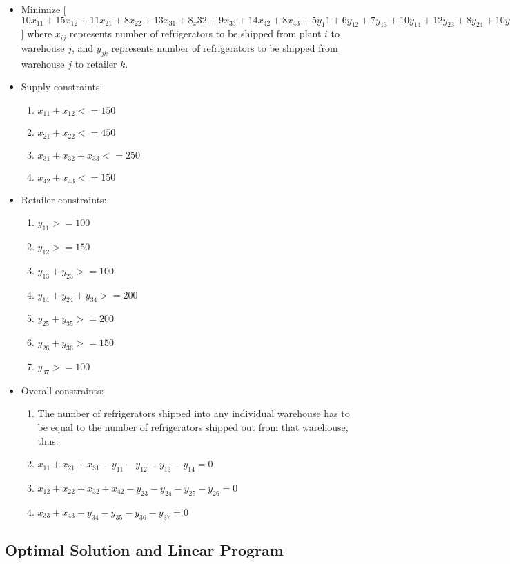 \documentclass[11pt]{scrreprt}
\begin{document}
\begin{itemize}
	\item Minimize
[$10x_{11}+15x_{12}+11x_{21}+8x_{22}+13x_{31}+8_x{32}+9x_{33}+14x_{42}+8x_{43}+5y_{1}1+6y_{12}+7y_{13}+10y_{14}+12y_{23}+8y_{24}+10y_{25}+14y_{26}+12y_{35}+12y_{36}+6y_{37}$] 
where $x_{ij}$ represents number of refrigerators to be shipped from 
plant $i$ to warehouse $j$, and $y_{jk}$ represents number of 
refrigerators to be shipped  from warehouse $j$ to retailer $k$.
	\item Supply constraints:
	\begin{enumerate}
		\item $x_{11} + x_{12} <= 150$
		\item $x_{21} + x_{22} <= 450$
		\item $x_{31} + x_{32} + x_{33} <= 250$
		\item $x_{42} + x_{43} <= 150$
	\end{enumerate}
	\item Retailer constraints:
	\begin{enumerate}
		\item $y_{11} >= 100$
		\item $y_{12} >= 150$
		\item $y_{13} + y_{23} >= 100$
		\item $y_{14} + y_{24} + y_{34} >= 200$
		\item $y_{25} + y_{35} >= 200$
		\item $y_{26} + y_{36} >= 150$
		\item $y_{37} >= 100$
	\end{enumerate}
	\item Overall constraints:
	\begin{enumerate}
		\item The number of refrigerators shipped into any individual 
		warehouse has to be equal to the number of refrigerators 
		shipped out from that warehouse, thus:
		\item $x_{11} + x_{21} + x_{31} - y_{11} - y_{12} - y_{13} - y_{14} = 0$
		\item $x_{12} + x_{22} + x_{32} + x_{42} - y_{23} - y_{24} - y_{25} - y_{26} = 0$
		\item $x_{33} + x_{43} - y_{34} - y_{35} - y_{36} - y_{37} = 0$
	\end{enumerate}
\end{itemize}

\subsection{Optimal Solution and Linear Program}
\end{document}

